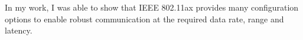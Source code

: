 In my work, I was able to show that IEEE 802.11ax provides many configuration options to enable robust communication at the required data rate, range and latency.






\begin{comment}
    Untersuchen, welche Routing protocols
    Wi-Fi offers a wide range of physical layer configurations, which can be used to reduce the data rate and enable robust communication.

    Future work could investigate whether modern Wi-Fi can be used for other \ac{WIC} use cases.
    IEEE 802.11bd is a new standard, which is designed for \ac{WIC} in the industrial domain.
\end{comment}